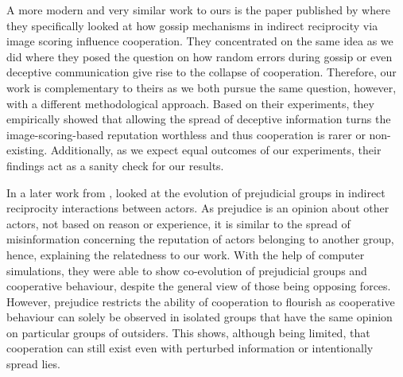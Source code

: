 \documentclass[sigconf]{acmart}
\begin{document}
    A more modern and very similar work to ours is the paper published by \citeauthor{szamado_deception_2016} \cite{szamado_deception_2016} where they specifically looked at how gossip mechanisms in indirect reciprocity via image scoring influence cooperation.
    They concentrated on the same idea as we did where they posed the question on how random errors during gossip or even deceptive communication give rise to the collapse of cooperation.
    Therefore, our work is complementary to theirs as we both pursue the same question, however, with a different methodological approach.
    Based on their experiments, they empirically showed that allowing the spread of deceptive information turns the image-scoring-based reputation worthless and thus cooperation is rarer or non-existing.
    Additionally, as we expect equal outcomes of our experiments, their findings act as a sanity check for our results.

    In a later work from \citeyear{whitaker_indirect_2018}, \citeauthor{whitaker_indirect_2018} \cite{whitaker_indirect_2018} looked at the evolution of prejudicial groups in indirect reciprocity interactions between actors.
    As prejudice is an opinion about other actors, not based on reason or experience, it is similar to the spread of misinformation concerning the reputation of actors belonging to another group, hence, explaining the relatedness to our work.
    With the help of computer simulations, they were able to show co-evolution of prejudicial groups and cooperative behaviour, despite the general view of those being opposing forces.
    However, prejudice restricts the ability of cooperation to flourish as cooperative behaviour can solely be observed in isolated groups that have the same opinion on particular groups of outsiders.
    This shows, although being limited, that cooperation can still exist even with perturbed information or intentionally spread lies.
\end{document}

